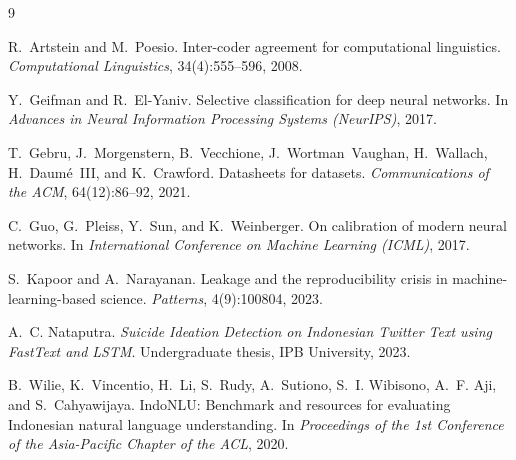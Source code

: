 \documentclass[10pt,a4paper]{article}
\begin{document}
\begin{thebibliography}{9}

R.~Artstein and M.~Poesio.
\newblock Inter-coder agreement for computational linguistics.
\newblock \emph{Computational Linguistics}, 34(4):555--596, 2008.

Y.~Geifman and R.~El-Yaniv.
\newblock Selective classification for deep neural networks.
\newblock In \emph{Advances in Neural Information Processing Systems (NeurIPS)}, 2017.

T.~Gebru, J.~Morgenstern, B.~Vecchione, J.~Wortman~Vaughan, H.~Wallach, H.~Daum\'e~III, and
K.~Crawford.
\newblock Datasheets for datasets.
\newblock \emph{Communications of the ACM}, 64(12):86--92, 2021.

C.~Guo, G.~Pleiss, Y.~Sun, and K.~Weinberger.
\newblock On calibration of modern neural networks.
\newblock In \emph{International Conference on Machine Learning (ICML)}, 2017.

S.~Kapoor and A.~Narayanan.
\newblock Leakage and the reproducibility crisis in machine-learning-based science.
\newblock \emph{Patterns}, 4(9):100804, 2023.

A.~C. Nataputra.
\newblock \emph{Suicide Ideation Detection on Indonesian Twitter Text using FastText and LSTM}.
\newblock Undergraduate thesis, IPB University, 2023.

B.~Wilie, K.~Vincentio, H.~Li, S.~Rudy, A.~Sutiono, S.~I. Wibisono, A.~F. Aji, and S.~Cahyawijaya.
\newblock IndoNLU: Benchmark and resources for evaluating Indonesian natural language
understanding.
\newblock In \emph{Proceedings of the 1st Conference of the Asia-Pacific Chapter of the ACL}, 2020.

\end{thebibliography}
\end{document}

